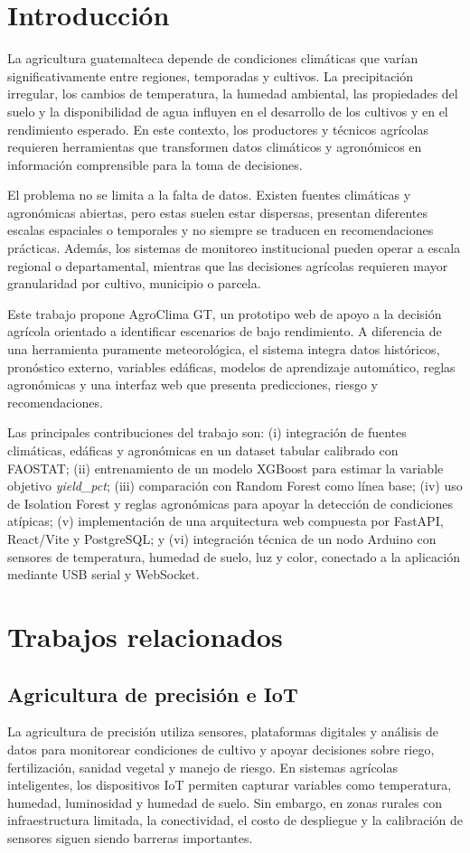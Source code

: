 \documentclass[conference,a4paper]{IEEEtran}
\begin{document}
\section{Introducción}
La agricultura guatemalteca depende de condiciones climáticas que varían significativamente entre regiones, temporadas y cultivos. La precipitación irregular, los cambios de temperatura, la humedad ambiental, las propiedades del suelo y la disponibilidad de agua influyen en el desarrollo de los cultivos y en el rendimiento esperado. En este contexto, los productores y técnicos agrícolas requieren herramientas que transformen datos climáticos y agronómicos en información comprensible para la toma de decisiones.

El problema no se limita a la falta de datos. Existen fuentes climáticas y agronómicas abiertas, pero estas suelen estar dispersas, presentan diferentes escalas espaciales o temporales y no siempre se traducen en recomendaciones prácticas. Además, los sistemas de monitoreo institucional pueden operar a escala regional o departamental, mientras que las decisiones agrícolas requieren mayor granularidad por cultivo, municipio o parcela.

Este trabajo propone AgroClima GT, un prototipo web de apoyo a la decisión agrícola orientado a identificar escenarios de bajo rendimiento. A diferencia de una herramienta puramente meteorológica, el sistema integra datos históricos, pronóstico externo, variables edáficas, modelos de aprendizaje automático, reglas agronómicas y una interfaz web que presenta predicciones, riesgo y recomendaciones.

Las principales contribuciones del trabajo son: (i) integración de fuentes climáticas, edáficas y agronómicas en un dataset tabular calibrado con FAOSTAT; (ii) entrenamiento de un modelo XGBoost para estimar la variable objetivo \textit{yield\_pct}; (iii) comparación con Random Forest como línea base; (iv) uso de Isolation Forest y reglas agronómicas para apoyar la detección de condiciones atípicas; (v) implementación de una arquitectura web compuesta por FastAPI, React/Vite y PostgreSQL; y (vi) integración técnica de un nodo Arduino con sensores de temperatura, humedad de suelo, luz y color, conectado a la aplicación mediante USB serial y WebSocket.

\section{Trabajos relacionados}
\subsection{Agricultura de precisión e IoT}
La agricultura de precisión utiliza sensores, plataformas digitales y análisis de datos para monitorear condiciones de cultivo y apoyar decisiones sobre riego, fertilización, sanidad vegetal y manejo de riesgo. En sistemas agrícolas inteligentes, los dispositivos IoT permiten capturar variables como temperatura, humedad, luminosidad y humedad de suelo. Sin embargo, en zonas rurales con infraestructura limitada, la conectividad, el costo de despliegue y la calibración de sensores siguen siendo barreras importantes.
\end{document}
